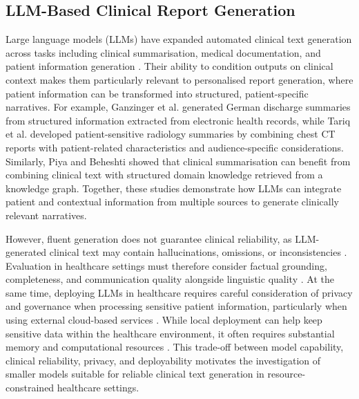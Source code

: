 \documentclass[ %
                    author={Aman Kumar Singh},
                supervisor={Dr. Edwin Simpson},
                    degree={MSc},
                     title={Quality-Aware Knowledge Distillation of Large Language Models for Efficient Personalised Clinical Report Generation},
                  subtitle={},
                      type={},
                      year={2021}]{dissertation}
\begin{document}
\subsection{LLM-Based Clinical Report Generation}
\label{sec:llm_clinical_report_generation}

Large language models (LLMs) have expanded automated clinical text generation across tasks including clinical summarisation, medical documentation, and patient information generation \cite{yuan_continued_2024,rehman_advancement_2025,alabed_large_2026,che_llm-driven_2026,makram_ai_2024}. Their ability to condition outputs on clinical context makes them particularly relevant to personalised report generation, where patient information can be transformed into structured, patient-specific narratives. For example, Ganzinger et al. \cite{ganzinger_automated_2025} generated German discharge summaries from structured information extracted from electronic health records, while Tariq et al. \cite{tariq_patient_2024} developed patient-sensitive radiology summaries by combining chest CT reports with patient-related characteristics and audience-specific considerations. Similarly, Piya and Beheshti \cite{piya_contextual_2025} showed that clinical summarisation can benefit from combining clinical text with structured domain knowledge retrieved from a knowledge graph. Together, these studies demonstrate how LLMs can integrate patient and contextual information from multiple sources to generate clinically relevant narratives.

However, fluent generation does not guarantee clinical reliability, as LLM-generated clinical text may contain hallucinations, omissions, or inconsistencies \cite{zeba_mitigating_2026}. Evaluation in healthcare settings must therefore consider factual grounding, completeness, and communication quality alongside linguistic quality \cite{dahlberg_measuring_2026}. At the same time, deploying LLMs in healthcare requires careful consideration of privacy and governance when processing sensitive patient information, particularly when using external cloud-based services \cite{annas_hipaa_2003,noauthor_eu_nodate,zhong_considerations_2025,al-dhabyani_data_2026}. While local deployment can help keep sensitive data within the healthcare environment, it often requires substantial memory and computational resources \cite{li_collm_2024}. This trade-off between model capability, clinical reliability, privacy, and deployability motivates the investigation of smaller models suitable for reliable clinical text generation in resource-constrained healthcare settings.
\end{document}
